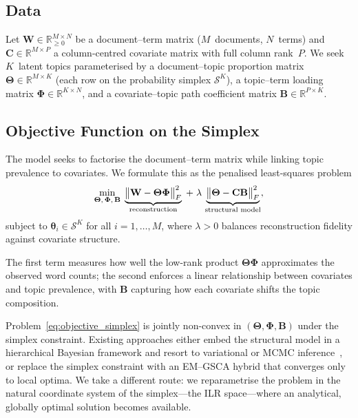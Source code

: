 \subsection{Data}

Let $\mathbf{W}\in\mathbb{R}_{\geq 0}^{M\times N}$ be a document--term
matrix ($M$~documents, $N$~terms) and
$\mathbf{C}\in\mathbb{R}^{M\times P}$ a column-centred covariate matrix
with full column rank~$P$. We seek $K$~latent topics parameterised by
a document--topic proportion matrix
$\boldsymbol{\Theta}\in\mathbb{R}^{M\times K}$ (each row on the
probability simplex $\mathcal{S}^K$), a topic--term loading matrix
$\boldsymbol{\Phi}\in\mathbb{R}^{K\times N}$, and a covariate--topic
path coefficient matrix $\mathbf{B}\in\mathbb{R}^{P\times K}$.


\subsection{Objective Function on the Simplex}
\label{subsec:objective_simplex}

The model seeks to factorise the document--term matrix while linking
topic prevalence to covariates. We formulate this as the penalised
least-squares problem
%
\begin{equation}
  \min_{\boldsymbol{\Theta},\,\boldsymbol{\Phi},\,\mathbf{B}}\;
  \underbrace{%
    \bigl\|\mathbf{W}
      - \boldsymbol{\Theta}\boldsymbol{\Phi}\bigr\|_F^2
  }_{\text{reconstruction}}
  \;+\;
  \lambda\,
  \underbrace{%
    \bigl\|\boldsymbol{\Theta}
      - \mathbf{C}\mathbf{B}\bigr\|_F^2
  }_{\text{structural model}},
  \label{eq:objective_simplex}
\end{equation}
%
subject to
$\boldsymbol{\theta}_i\in\mathcal{S}^K$ for all $i=1,\dots,M$,
where $\lambda>0$ balances reconstruction fidelity against covariate
structure.

The first term measures how well the low-rank product
$\boldsymbol{\Theta}\boldsymbol{\Phi}$ approximates the observed word
counts; the second enforces a linear relationship between covariates
and topic prevalence, with $\mathbf{B}$ capturing how each covariate
shifts the topic composition.

\begin{remark}
\label{rem:core_difficulty}
Problem~\eqref{eq:objective_simplex} is jointly non-convex in
$(\boldsymbol{\Theta},\boldsymbol{\Phi},\mathbf{B})$ under the
simplex constraint. Existing approaches either embed the structural
model in a hierarchical Bayesian framework and resort to variational
or MCMC inference~\citep{roberts2014stm}, or replace the simplex
constraint with an EM--GSCA hybrid that converges only to local
optima. We take a different route: we reparametrise the problem in
the natural coordinate system of the simplex---the ILR space---where
an analytical, globally optimal solution becomes available.
\end{remark}


